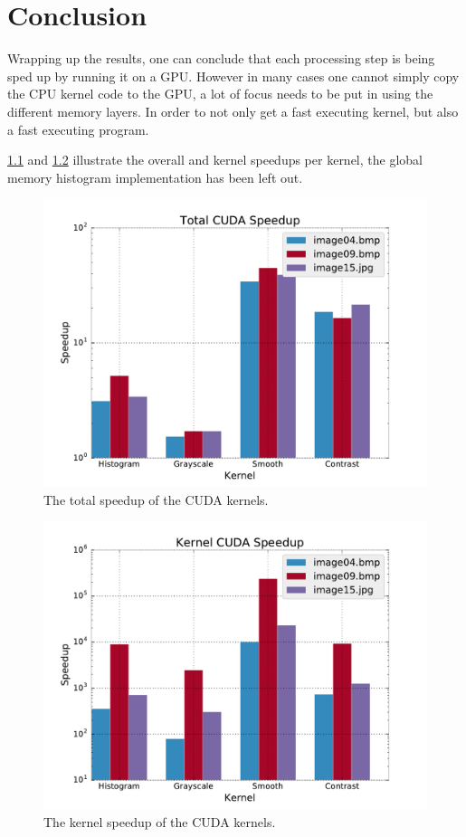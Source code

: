 \documentclass[final]{report}
\begin{document}
\chapter{Conclusion}

Wrapping up the results, one can conclude that each processing step is being sped up by running it on a GPU.
However in many cases one cannot simply copy the CPU kernel code to the GPU, a lot of focus needs to be put in using the different memory layers.
In order to not only get a fast executing kernel, but also a fast executing program.

\cref{fig:total-cuda-speedup} and \cref{fig:kernel-cuda-speedup} illustrate the overall and kernel speedups per kernel, the global memory histogram implementation has been left out.

\begin{figure}[H]
\centering
    \includegraphics[width=\linewidth]{resources/total-cuda-speedup-shared.pdf}
    \caption{The total speedup of the CUDA kernels.}
    \label{fig:total-cuda-speedup}
\end{figure}

\begin{figure}[H]
\centering
    \includegraphics[width=\linewidth]{resources/kernel-cuda-speedup-shared.pdf}
    \caption{The kernel speedup of the CUDA kernels.}
    \label{fig:kernel-cuda-speedup}
\end{figure}
\end{document}
